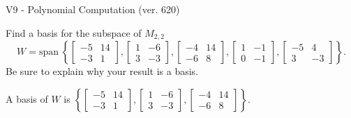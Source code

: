 \begin{exercise}
  \begin{exerciseTitle}V9 - Polynomial Computation (ver. 620)\end{exerciseTitle}
  \begin{exerciseStatement}
    Find a basis for the subspace of \(M_{2,2}\) 
\[W=\mathrm{span}\ \left\{\left[\begin{array}{cc}
-5 & 14 \\
-3 & 1
\end{array}\right] , \left[\begin{array}{cc}
1 & -6 \\
3 & -3
\end{array}\right] , \left[\begin{array}{cc}
-4 & 14 \\
-6 & 8
\end{array}\right] , \left[\begin{array}{cc}
1 & -1 \\
0 & -1
\end{array}\right] , \left[\begin{array}{cc}
-5 & 4 \\
3 & -3
\end{array}\right]\right\}.\]
 Be sure to explain why your result is a basis.


  \end{exerciseStatement}
  \begin{exerciseAnswer}
   A basis of \(W\) is  \(\left\{\left[\begin{array}{cc}
-5 & 14 \\
-3 & 1
\end{array}\right] , \left[\begin{array}{cc}
1 & -6 \\
3 & -3
\end{array}\right] , \left[\begin{array}{cc}
-4 & 14 \\
-6 & 8
\end{array}\right]\right\}\).
  


  \end{exerciseAnswer}
\end{exercise}